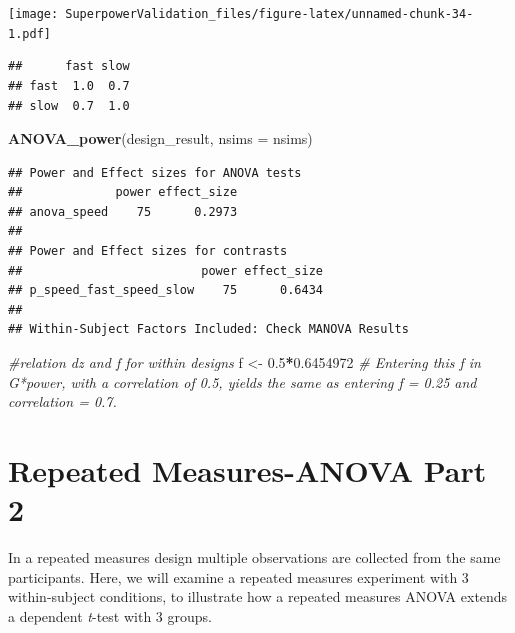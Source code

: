 \documentclass[]{book}
\newenvironment{Shaded}{\begin{snugshade}}{\end{snugshade}}
\newcommand{\CommentTok}[1]{\textcolor[rgb]{0.56,0.35,0.01}{\textit{#1}}}
\newcommand{\DataTypeTok}[1]{\textcolor[rgb]{0.13,0.29,0.53}{#1}}
\newcommand{\FloatTok}[1]{\textcolor[rgb]{0.00,0.00,0.81}{#1}}
\newcommand{\KeywordTok}[1]{\textcolor[rgb]{0.13,0.29,0.53}{\textbf{#1}}}
\newcommand{\NormalTok}[1]{#1}
\newcommand{\OperatorTok}[1]{\textcolor[rgb]{0.81,0.36,0.00}{\textbf{#1}}}
\newcommand{\StringTok}[1]{\textcolor[rgb]{0.31,0.60,0.02}{#1}}
\begin{document}
\texttt{[image: SuperpowerValidation\_files/figure-latex/unnamed-chunk-34-1.pdf]}

\begin{Shaded}
\end{Shaded}

\begin{verbatim}
##      fast slow
## fast  1.0  0.7
## slow  0.7  1.0
\end{verbatim}

\begin{Shaded}
\begin{Highlighting}[]
\KeywordTok{ANOVA_power}\NormalTok{(design_result, }\DataTypeTok{nsims =}\NormalTok{ nsims)}
\end{Highlighting}
\end{Shaded}

\begin{verbatim}
## Power and Effect sizes for ANOVA tests
##             power effect_size
## anova_speed    75      0.2973
## 
## Power and Effect sizes for contrasts
##                         power effect_size
## p_speed_fast_speed_slow    75      0.6434
## 
## Within-Subject Factors Included: Check MANOVA Results
\end{verbatim}

\begin{Shaded}
\begin{Highlighting}[]
\CommentTok{#relation dz and f for within designs }
\NormalTok{f <-}\StringTok{ }\FloatTok{0.5}\OperatorTok{*}\FloatTok{0.6454972}
\CommentTok{# Entering this f in G*power, with a correlation of 0.5, yields the same as entering f = 0.25 and correlation = 0.7. }
\end{Highlighting}
\end{Shaded}

\hypertarget{repeated-measures-anova-part-2}{%
\chapter{Repeated Measures-ANOVA Part 2}\label{repeated-measures-anova-part-2}}

In a repeated measures design multiple observations are collected from the same participants. Here, we will examine a repeated measures experiment with 3 within-subject conditions, to illustrate how a repeated measures ANOVA extends a dependent \emph{t}-test with 3 groups.
\end{document}
